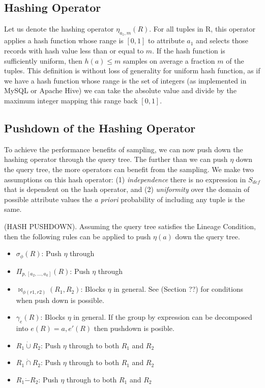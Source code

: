 \subsection{Hashing Operator}
Let us denote the hashing operator $\eta_{a_1, m}(R)$. 
For all tuples in R, this operator applies a hash function whose range is $[0,1]$ to attribute $a_1$ and selects those records with hash value less than or equal to $m$.
If the hash function is sufficiently uniform, then $h(a) \le m$ samples on average a fraction $m$ of the tuples.
This definition is without loss of generality for uniform hash function, as if we have a hash function whose range is the set of integers (as implemented in MySQL or Apache Hive) we can take the absolute value and divide by the maximum integer mapping this range back $[0,1]$. 

\subsection{Pushdown of the Hashing Operator}
To achieve the performance benefits of sampling, we can now push down the hashing operator through the query tree.
The further than we can push $\eta$ down the query tree, the more operators can benefit from the sampling.
We make two assumptions on this hash operator: (1) \emph{independence} there is no expression in $S_{def}$ that is dependent on the hash operator, and (2) \emph{uniformity} over the domain of possible attribute values the \emph{a priori} probability of including any tuple is the same.

\begin{proposition}
(HASH PUSHDOWN). Assuming the query tree satisfies the Lineage Condition, then the following rules can be applied to push $\eta(a)$ down the query tree. 
\begin{itemize}\vspace{-.45em}
\item $\sigma_{\phi}(R)$: Push $\eta$ through \vspace{-.45em}
\item $\Pi_{p,[a_2,...,a_k]}(R)$: Push $\eta $ through \vspace{-.45em}
\item $\bowtie_{\phi (r1,r2)}(R_1,R_2)$: Blocks $\eta $ in general. See (Section ??) for conditions when push down is possible.
\item $\gamma_{e}(R)$: Blocks $\eta$ in general. If the group by expression can be decomposed into $e(R) = a, e'(R)$ then pushdown is posible.\vspace{-.45em}
\item $R_1 \dot{\cup} R_2$: Push $\eta $ through to both $R_1$ and $R_2$
\item $R_1 \dot{\cap} R_2$: Push $\eta $ through to both $R_1$ and $R_2$
\item $R_1 \dot{-} R_2$: Push $\eta $ through to both $R_1$ and $R_2$
\end{itemize}
\end{proposition}

